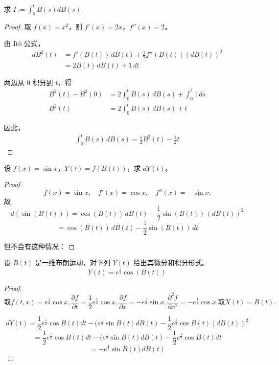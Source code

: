 \documentclass[lang=cn,10pt,thmcnt=section]{elegantbook}
\begin{document}
\begin{example}
	求 \( I := \int_0^t B(s) dB(s) \).
\end{example}
\begin{proof}
	取 \( f(x) = x^2 \)，则 \( f'(x) = 2x \)，\( f''(x) = 2 \)。

	由 Itô 公式，
	\begin{align*}
	dB^2(t) &= f'(B(t))\, dB(t) + \frac{1}{2} f''(B(t)) (dB(t))^2 \\
			&= 2B(t)\, dB(t) + 1\, dt
	\end{align*}
	
	两边从 0 积分到 t，得
	\begin{align*}
	B^2(t) - B^2(0) &= 2 \int_0^t B(s)\, dB(s) + \int_0^t 1\, ds \\
	B^2(t) &= 2 \int_0^t B(s)\, dB(s) + t
	\end{align*}
	
	因此，
	\begin{align*}
	\int_0^t B(s)\, dB(s) = \frac{1}{2} B^2(t) - \frac{1}{2} t
	\end{align*}
\end{proof}
\begin{example}
	设 \( f(x) = \sin x \)，\( Y(t) = f(B(t)) \)，求 \( dY(t) \)。
\end{example}
\begin{proof}
	\[
	f(x) = \sin x,\quad f'(x) = \cos x,\quad f''(x) = -\sin x.
	\]
	故
	\[
	d(\sin(B(t))) = \cos(B(t))\, dB(t) - \frac{1}{2} \sin(B(t))\, (dB(t))^2
	\]
	\[
	= \cos(B(t))\, dB(t) - \frac{1}{2} \sin(B(t))\, dt
	\]
	
	但不会有这种情况：
\end{proof}
\begin{example}
	设 \( B(t) \) 是一维布朗运动，对下列 \( Y(t) \) 给出其微分和积分形式。
\[
Y(t) = e^{\frac{1}{2} }\cos(B(t))
\]
\end{example}
\begin{proof}
$$	\text{取}   f(t, x) = e^{\frac{1}{2}} \cos x, \frac{\partial f}{\partial t} = \frac{1}{2} e^{\frac{1}{2}} \cos x, \frac{\partial f}{\partial x} = - e^{\frac{1}{2}} \sin x,
\frac{\partial^2 f}{\partial x^2} = - e^{\frac{1}{2}} \cos x. \text{取} X(t) = B(t).$$


\[
dY(t) = \frac{1}{2} e^{\frac{1}{2}} \cos B(t) dt - (e^{\frac{1}{2}} \sin B(t) dB(t) - \frac{1}{2} e^{\frac{1}{2}} \cos B(t) (dB(t))^2
\]
\[
= \frac{1}{2} e^{\frac{1}{2}} \cos B(t) dt - (e^{\frac{1}{2}} \sin B(t) dB(t) - \frac{1}{2} e^{\frac{1}{2}} \cos B(t) dt
\]
\[
= - e^{\frac{1}{2}} \sin B(t) dB(t)
\]
\end{proof}
\end{document}
